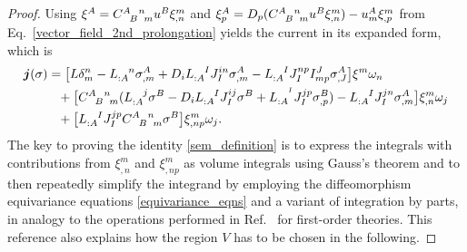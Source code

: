 \begin{proof}
  Using $\xi^A = \gmc{A}{B}{n}{m}u^B\xi^m_{,n}$ and $\xi^A_p = D_p(\gmc{A}{B}{n}{m}u^B\xi^m_{,n})-u^A_m\xi^m_{,p}$ from Eq.\ \ref{vector_field_2nd_prolongation} yields the current in its expanded form, which is
  \begin{equation}\label{sem_calculation_current}
    \begin{aligned}
      \boldsymbol{j}(\sigma) &{} = \big\lbrack L\delta^n_m - L_{:A}^{\hphantom{:A}n}\sigma^A_{,m} + D_iL_{:A}^{\hphantom{:A}I}J_I^{in}\sigma^A_{,m}-L_{:A}^{\hphantom{:A}I}J_I^{np}I^J_{mp}\sigma^A_{,J}\big\rbrack \xi^m \omega_n \\
                             &{} \hphantom{=} + \big\lbrack \gmc{A}{B}{n}{m}(L_{:A}^{\hphantom{:A}j}\sigma^B - D_iL_{:A}^{\hphantom{:A}I}J_{I}^{ij}\sigma^B + L_{:A}^{\hphantom{:A}^I}J_{I}^{jp}\sigma^B_{,p}) - L_{:A}^{\hphantom{:A}I} J_I^{jn} \sigma^A_{,m}\big\rbrack \xi^m_{,n}\omega_j \\
                             &{} \hphantom{=} + \big\lbrack L_{:A}^{\hphantom{:A}I} J_I^{jp} \gmc{A}{B}{n}{m}\sigma^B\big\rbrack \xi^m_{,np}\omega_j.
    \end{aligned}
  \end{equation}
  The key to proving the identity \eqref{sem_definition} is to express the integrals with contributions from $\xi^m_{,n}$ and $\xi^m_{,np}$ as volume integrals using Gauss's theorem and to then repeatedly simplify the integrand by employing the diffeomorphism equivariance equations \eqref{equivariance_eqns} and a variant of integration by parts, in analogy to the operations performed in Ref.\ \cite{Gotay_1992} for first-order theories. This reference also explains how the region $V$ has to be chosen in the following.


\end{proof}
